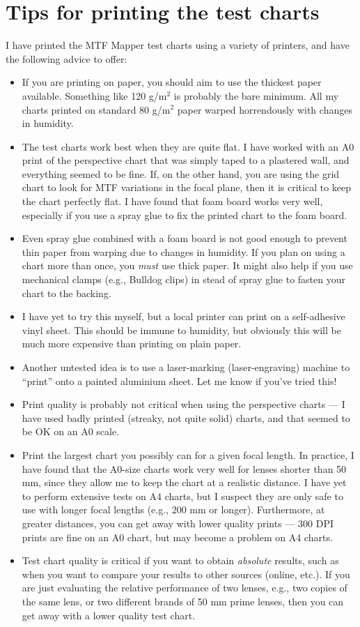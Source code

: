 \documentclass[a4paper]{article}
\begin{document}
\section{Tips for printing the test charts}
\label{sec:tips}
I have printed the MTF Mapper test charts using a variety of printers, and
have the following advice to offer:
\begin{itemize}
  \item If you are printing on paper, you should aim to use the thickest
  paper available. Something like 120 g/m$^2$ is probably the bare minimum.
  All my charts printed on standard 80 g/m$^2$ paper warped horrendously
  with changes in humidity.
  \item The test charts work best when they are quite flat. I have worked
  with an A0 print of the perspective chart that was simply taped to a
  plastered wall, and everything seemed to be fine. If, on the other hand,
  you are using the grid chart to look for MTF variations in the focal plane, 
  then it is critical to keep the chart perfectly
  flat. I have found that foam board works very well, especially if you use
  a spray glue to fix the printed chart to the foam board.
  \item Even spray glue combined with a foam board is not good enough to
  prevent thin paper from warping due to changes in humidity. If you plan on
  using a chart more than once, you \emph{must} use thick paper. It might
  also help if you use mechanical clamps (e.g., Bulldog clips) in stead of
  spray glue to fasten your chart to the backing.
  \item I have yet to try this myself, but a local printer can print on a
  self-adhesive vinyl sheet. This should be immune to humidity, but
  obviously this will be much more expensive than printing on plain paper.
  \item Another untested idea is to use a laser-marking (laser-engraving)
  machine to ``print'' onto a painted aluminium sheet. Let me know if 
  you've tried this!
  \item Print quality is probably not critical when using the perspective
  charts --- I have used badly printed (streaky, not quite solid) charts,
  and that seemed to be OK on an A0 scale.
  \item Print the largest chart you possibly can for a given focal length.
  In practice, I have found that the A0-size charts work very well for
  lenses shorter than 50 mm, since they allow me to keep the chart at a 
  realistic distance. I have yet to perform extensive tests on A4 charts, 
  but I suspect they are only safe to  use with longer focal lengths 
  (e.g., 200 mm or longer). Furthermore, at greater distances, you can get
  away with lower quality prints --- 300 DPI prints are fine on an A0 chart,
  but may become a problem on A4 charts.
  \item Test chart quality is critical if you want to obtain \emph{absolute}
  results, such as when you want to compare your results to other sources
  (online, etc.). If you are just evaluating the relative performance of two
  lenses, e.g., two copies of the same lens, or two different brands of 50
  mm prime lenses, then you can get away with a lower quality test chart.
\end{itemize}
\end{document}
